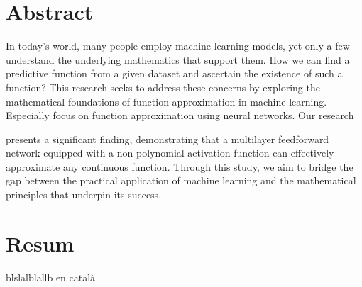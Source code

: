 \documentclass[../../main.tex]{subfiles}
\begin{document}
\chapter*{Abstract}\label{ch:abstract} 
\noindent 

In today's world, many people employ machine learning models, yet only a few understand the underlying mathematics that support them. 
How we can find a predictive function from a given dataset and ascertain the existence of such a function? This research seeks to address these concerns by exploring the mathematical foundations of function approximation in machine learning. Especially focus on function approximation using neural networks. Our research 



presents a significant finding, demonstrating that a multilayer feedforward network equipped with a non-polynomial activation function can effectively approximate any continuous function. Through this study, we aim to bridge the gap between the practical application of machine learning and the mathematical principles that underpin its success.


\chapter*{Resum}



blslalblallb en català
\end{document}
